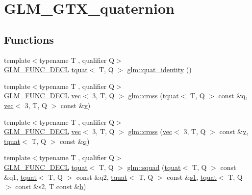 \hypertarget{group__gtx__quaternion}{}\section{G\+L\+M\+\_\+\+G\+T\+X\+\_\+quaternion}
\label{group__gtx__quaternion}
\subsection*{Functions}
\begin{DoxyCompactItemize}
\item 
{\footnotesize template$<$typename T , qualifier Q$>$ }\\\hyperlink{setup_8hpp_ab2d052de21a70539923e9bcbf6e83a51}{G\+L\+M\+\_\+\+F\+U\+N\+C\+\_\+\+D\+E\+CL} \hyperlink{structglm_1_1tquat}{tquat}$<$ T, Q $>$ \hyperlink{group__gtx__quaternion_ga40788ce1d74fac29fa000af893a3ceb5}{glm\+::quat\+\_\+identity} ()
\item 
{\footnotesize template$<$typename T , qualifier Q$>$ }\\\hyperlink{setup_8hpp_ab2d052de21a70539923e9bcbf6e83a51}{G\+L\+M\+\_\+\+F\+U\+N\+C\+\_\+\+D\+E\+CL} \hyperlink{structglm_1_1vec}{vec}$<$ 3, T, Q $>$ \hyperlink{group__gtx__quaternion_ga8639615408166d0dddda1b91a940b338}{glm\+::cross} (\hyperlink{structglm_1_1tquat}{tquat}$<$ T, Q $>$ const \&\hyperlink{_s_d_l__opengl_8h_a8fc1e7b9baaae687804c7eed46ca09c6}{q}, \hyperlink{structglm_1_1vec}{vec}$<$ 3, T, Q $>$ const \&\hyperlink{_s_d_l__opengl_8h_a10a82eabcb59d2fcd74acee063775f90}{v})
\item 
{\footnotesize template$<$typename T , qualifier Q$>$ }\\\hyperlink{setup_8hpp_ab2d052de21a70539923e9bcbf6e83a51}{G\+L\+M\+\_\+\+F\+U\+N\+C\+\_\+\+D\+E\+CL} \hyperlink{structglm_1_1vec}{vec}$<$ 3, T, Q $>$ \hyperlink{group__gtx__quaternion_gaa75ca5654e0dc3b61c05db091f7d46ce}{glm\+::cross} (\hyperlink{structglm_1_1vec}{vec}$<$ 3, T, Q $>$ const \&\hyperlink{_s_d_l__opengl_8h_a10a82eabcb59d2fcd74acee063775f90}{v}, \hyperlink{structglm_1_1tquat}{tquat}$<$ T, Q $>$ const \&\hyperlink{_s_d_l__opengl_8h_a8fc1e7b9baaae687804c7eed46ca09c6}{q})
\item 
{\footnotesize template$<$typename T , qualifier Q$>$ }\\\hyperlink{setup_8hpp_ab2d052de21a70539923e9bcbf6e83a51}{G\+L\+M\+\_\+\+F\+U\+N\+C\+\_\+\+D\+E\+CL} \hyperlink{structglm_1_1tquat}{tquat}$<$ T, Q $>$ \hyperlink{group__gtx__quaternion_gacfcb16619e166e672c4672aff50a565c}{glm\+::squad} (\hyperlink{structglm_1_1tquat}{tquat}$<$ T, Q $>$ const \&q1, \hyperlink{structglm_1_1tquat}{tquat}$<$ T, Q $>$ const \&q2, \hyperlink{structglm_1_1tquat}{tquat}$<$ T, Q $>$ const \&\hyperlink{_s_d_l__opengl__glext_8h_a4ed25fb4dc5bf1a768a78d2e2f0ca003}{s1}, \hyperlink{structglm_1_1tquat}{tquat}$<$ T, Q $>$ const \&s2, T const \&\hyperlink{_s_d_l__opengl__glext_8h_afa0fb1b5e976920c0abeff2dca3ed774}{h})

\end{DoxyCompactItemize}
